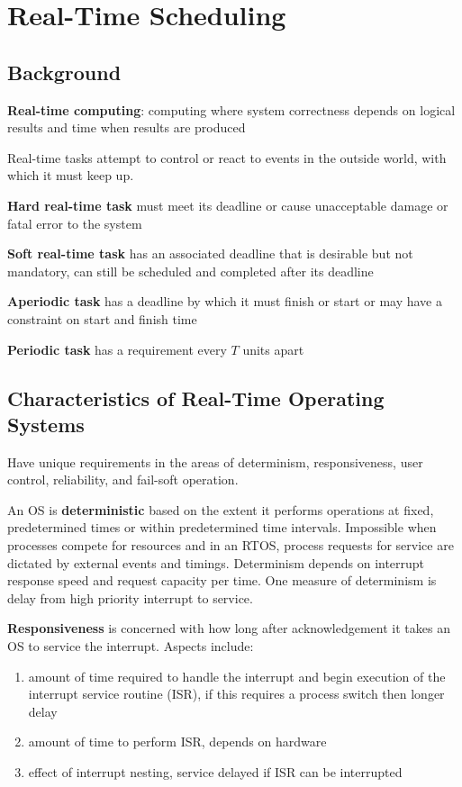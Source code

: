 \documentclass[11pt]{article}
\begin{document}
\section{Real-Time Scheduling}
\label{sec:org9b383f7}
\subsection{Background}
\label{sec:org1540f2b}
\textbf{Real-time computing}: computing where system correctness depends on logical results and time when
results are produced

Real-time tasks attempt to control or react to events in the outside world, with which it must keep up.

\textbf{Hard real-time task} must meet its deadline or cause unacceptable damage or fatal error to the system

\textbf{Soft real-time task} has an associated deadline that is desirable but not mandatory, can still be
scheduled and completed after its deadline

\textbf{Aperiodic task} has a deadline by which it must finish or start or may have a constraint on
start and finish time

\textbf{Periodic task} has a requirement every \(T\) units apart
\subsection{Characteristics of Real-Time Operating Systems}
\label{sec:org4c48af7}
Have unique requirements in the areas of determinism, responsiveness, user control, reliability,
and fail-soft operation.

An OS is \textbf{deterministic} based on the extent it performs operations at fixed, predetermined times
or within predetermined time intervals.
Impossible when processes compete for resources and in an RTOS, process requests for service are
dictated by external events and timings.
Determinism depends on interrupt response speed and request capacity per time.
One measure of determinism is delay from high priority interrupt to service.

\textbf{Responsiveness} is concerned with how long after acknowledgement it takes an OS to service the
interrupt.
Aspects include:
\begin{enumerate}
\item amount of time required to handle the interrupt and begin execution of the interrupt service
routine (ISR), if this requires a process switch then longer delay
\item amount of time to perform ISR, depends on hardware
\item effect of interrupt nesting, service delayed if ISR can be interrupted
\end{enumerate}
\end{document}
